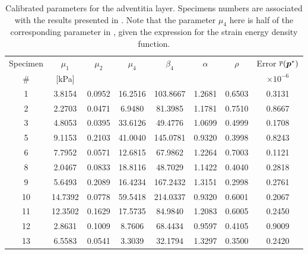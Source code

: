 \begin{table}[ht!]
\caption[Calibrated parameters for the adventitia layer.]{Calibrated parameters for the adventitia layer. Specimens numbers are associated with the results presented in \cite{holzapfel2005determination}. Note that the parameter $\mu_4$ here is half of the corresponding parameter in \cite{holzapfel2005determination}, given the expression for the strain energy density function.}
\label{tab:cal-par-det-adv}
\begin{center}
    \begin{tabular}{|c |c| c| c| c| c| c| c|} 
 \hline
 \quad Specimen \quad & \quad $\mu_1$ \quad & \quad $\mu_2$ \quad & \quad $\mu_4$ \quad & \quad $\beta_4$ \quad & \quad $\alpha$ \quad & \quad $\rho$ \quad & Error $\overline{r}(\boldsymbol{p}^*)$ \quad \\
 \quad \# \quad & [kPa] \quad & \quad [kPa] \quad & \quad [kPa] \quad & \quad [--] \quad & \quad [rad] \quad & \quad [--] \quad & $\times 10^{-6}$ \quad \\
 \cline{1-8} 
    1 & 3.8154 & 0.0952   & 16.2516  & 103.8667 & 1.2681 & 0.6503 & 0.3131\\
    2 & 2.2703 & 0.0471   & 6.9480  & 81.3985 & 1.1781 & 0.7510 & 0.8667\\
    3 & 4.8053 & 0.0395   & 33.6126 & 49.4776 & 1.0699 & 0.4999 & 0.1708\\
    5 & 9.1153 & 0.2103   & 41.0040 & 145.0781 & 0.9320 & 0.3998 & 0.8243\\
    6 & 7.7952 & 0.0571   & 12.6815 & 67.9862 & 1.2264 & 0.7003 & 0.1121\\
    8 & 2.0467 & 0.0833   & 18.8116 & 48.7029 & 1.1422 & 0.4040 & 0.2818 \\
    9 & 5.6493 & 0.2089   & 16.4234 & 167.2432 & 1.3151 & 0.2998 & 0.2761\\
    10 & 14.7392 & 0.0778 & 59.5418 & 214.0337 & 0.9320 & 0.6001 & 0.2067\\
    11 & 12.3502 & 0.1629 & 17.5735 & 84.9840 & 1.2083 & 0.6005 & 0.2450\\
    12 & 2.8631 & 0.1009  & 8.7606 & 68.4434 & 0.9597 & 0.4105 & 0.9009\\
    13 & 6.5583 & 0.0541  &  3.3039 & 32.1794 & 1.3297 & 0.3500 & 0.2420\\
 \hline 
\end{tabular}
\end{center}
\end{table}

